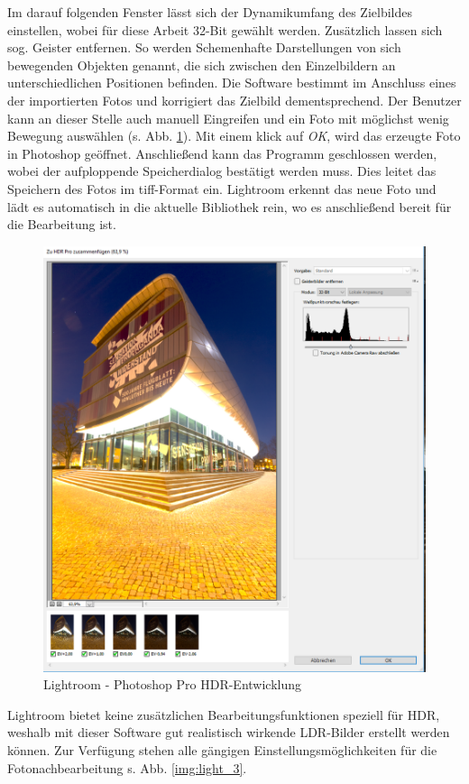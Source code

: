 \documentclass[liststotoc,bibtotoc,fontsize=14pt,]{scrreprt}
\begin{document}
		Im darauf folgenden Fenster lässt sich der Dynamikumfang des Zielbildes einstellen, wobei für diese Arbeit 32-Bit gewählt werden. Zusätzlich lassen sich sog. Geister entfernen. So werden Schemenhafte Darstellungen von sich bewegenden Objekten genannt, die sich zwischen den Einzelbildern an unterschiedlichen Positionen befinden. Die Software bestimmt im Anschluss eines der importierten Fotos und korrigiert das Zielbild dementsprechend. Der Benutzer kann an dieser Stelle auch manuell Eingreifen und ein Foto mit möglichst wenig Bewegung auswählen (s. Abb. \ref{img:light_2}). Mit einem klick auf \textit{OK}, wird das erzeugte Foto in Photoshop geöffnet. Anschließend kann das Programm geschlossen werden, wobei der aufploppende Speicherdialog bestätigt werden muss. Dies leitet das Speichern des Fotos im tiff-Format ein. Lightroom erkennt das neue Foto und lädt es automatisch in die aktuelle Bibliothek rein, wo es anschließend bereit für die Bearbeitung ist.
		
		\bigskip
		\begin{figure}[H]
			\includegraphics[width=.95\linewidth]{img/lightroom2.png}
			\caption{Lightroom - Photoshop Pro HDR-Entwicklung}
			\label{img:light_2}
		\end{figure}
		
		Lightroom bietet keine zusätzlichen Bearbeitungsfunktionen speziell für HDR, weshalb mit dieser Software gut realistisch wirkende LDR-Bilder erstellt werden können. Zur Verfügung stehen alle gängigen Einstellungsmöglichkeiten für die Fotonachbearbeitung s. Abb. \ref{img:light_3}.
		
\end{document}
